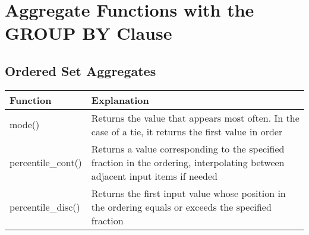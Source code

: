 \section{Aggregate Functions with the GROUP BY Clause}
\subsection{Ordered Set Aggregates}
\begin{table}
    \centering
    \begin{tabularx}{\textwidth}{lX}
        \hline
        Function           & Explanation                                                                                                                   \\
        \hline
        mode()             & Returns the value that appears most often. In the case of a tie, it returns the first value in order                          \\
        percentile\_cont() & Returns a value corresponding to the specified fraction in the ordering, interpolating between adjacent input items if needed \\
        percentile\_disc() & Returns the first input value whose position in the ordering equals or exceeds the specified fraction                         \\
        \hline
    \end{tabularx}
\end{table}